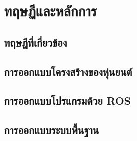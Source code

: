 \chapter{ทฤษฏีและหลักการ}

\section{ทฤษฎีที่เกี่ยวข้อง}



\clearpage
\section{การออกแบบโครงสร้างของหุ่นยนต์}


\section{การออกแบบโปรแกรมด้วย ROS}


\clearpage

\section{การออกแบบระบบพื้นฐาน}


